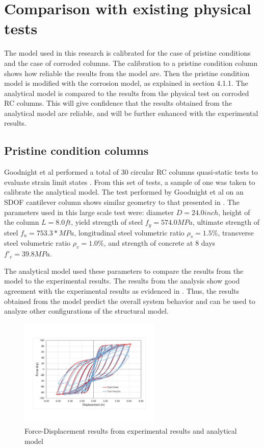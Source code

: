 \section{Comparison with existing physical tests}
The model used in this research is calibrated for the case of pristine conditions and the case of corroded columns. The calibration to a pristine condition column shows how reliable the results from the model are. Then the pristine condition model is modified with the corrosion model, as explained in section 4.1.1. The analytical model is compared to the results from the physical test on corroded RC columns. This will give confidence that the results obtained from the analytical model are reliable, and will be further enhanced with the experimental results.
\subsection{Pristine condition columns}
Goodnight et al performed a total of 30 circular RC columns quasi-static tests to evaluate strain limit states \cite{Goodnight2016}. From this set of tests, a sample of one was taken to calibrate the analytical model. The test performed by Goodnight et al on an SDOF cantilever column shows similar geometry to that presented in . The parameters used in this large scale test were: diameter $D = 24.0 inch$, height of the column $L = 8.0 ft$, yield strength of steel $f_{y} = 574.0 MPa$, ultimate strength of steel $f_{u} = 753.3 * MPa$, longitudinal steel volumetric ratio $\rho_{s} = 1.5\% $, transverse steel volumetric ratio $\rho_{v} = 1.0\% $, and strength of concrete at 8 days $f'_{c} = 39.8 MPa$.

The analytical model used these parameters to compare the results from the model to the experimental results. The results from the analysis show good agreement with the experimental results as evidenced in . Thus, the results obtained from the model predict the overall system behavior and can be used to analyze other configurations of the structural model.
\begin{figure}[htbp]
	\centering
	\includegraphics[width=0.6\textwidth]{Chapter-5/figs/Model_Calibration_Goodnight2016}
	\caption{Force-Displacement results from experimental results \cite{Goodnight2013} and analytical model}
	\label{fig:ModelCalibration}
\end{figure}
\newpage

